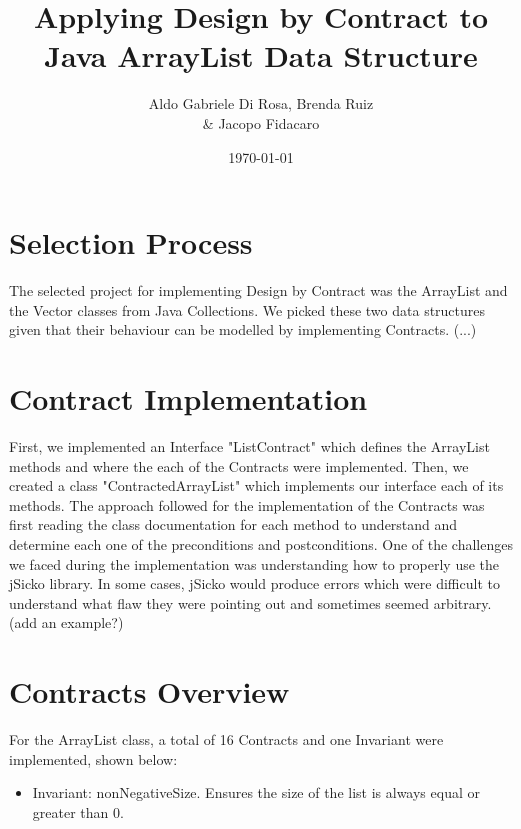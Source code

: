 \documentclass[a4paper]{article}
\title{Applying Design by Contract to \\ Java ArrayList Data Structure}
\author{Aldo Gabriele Di Rosa, Brenda Ruiz \\ \& Jacopo Fidacaro}
\date{\today}
\begin{document}
\maketitle

\section{Selection Process}

The selected project for implementing Design by Contract was the ArrayList and the Vector classes from Java Collections. We picked these two data structures given that their behaviour can be modelled by implementing Contracts.  (...)

\section{Contract Implementation}

First, we implemented an Interface "ListContract" which defines the ArrayList methods and where the each of the Contracts were implemented. Then, we created a class "ContractedArrayList" which implements our interface each of its methods.
The approach followed for the implementation of the Contracts was first reading the class documentation for each method to understand and determine each one of the preconditions and postconditions. 
One of the challenges we faced during the implementation was understanding how to properly use the jSicko library. In some cases, jSicko would produce errors which were difficult to understand what flaw they were pointing out and sometimes seemed arbitrary. (add an example?) 

\section{Contracts Overview}
For the ArrayList class, a total of 16 Contracts and one Invariant were implemented, shown below:
\begin{itemize}
 \item Invariant: nonNegativeSize. Ensures the size of the list is always equal or greater than 0.
\end{itemize}
\end{document}

